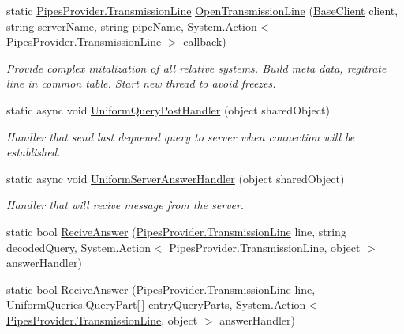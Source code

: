 \begin{DoxyCompactItemize}
static \mbox{\hyperlink{class_pipes_provider_1_1_transmission_line}{Pipes\+Provider.\+Transmission\+Line}} \mbox{\hyperlink{class_uniform_client_1_1_base_client_a80e2da33cf28945db058cd59f7ac5e58}{Open\+Transmission\+Line}} (\mbox{\hyperlink{class_uniform_client_1_1_base_client}{Base\+Client}} client, string server\+Name, string pipe\+Name, System.\+Action$<$ \mbox{\hyperlink{class_pipes_provider_1_1_transmission_line}{Pipes\+Provider.\+Transmission\+Line}} $>$ callback)
\begin{DoxyCompactList}\small\item\em Provide complex initalization of all relative systems. Build meta data, regitrate line in common table. Start new thread to avoid freezes. \end{DoxyCompactList}\item 
static async void \mbox{\hyperlink{class_uniform_client_1_1_base_client_a05120a32c8a00263c7e2fc8b9fa152d8}{Uniform\+Query\+Post\+Handler}} (object shared\+Object)
\begin{DoxyCompactList}\small\item\em Handler that send last dequeued query to server when connection will be established. \end{DoxyCompactList}\item 
static async void \mbox{\hyperlink{class_uniform_client_1_1_base_client_af7a3c613846c8595431272c4c9d531f3}{Uniform\+Server\+Answer\+Handler}} (object shared\+Object)
\begin{DoxyCompactList}\small\item\em Handler that will recive message from the server. \end{DoxyCompactList}\item 
static bool \mbox{\hyperlink{class_uniform_client_1_1_base_client_a6525d87fd1df20689b0a01280e36c5c1}{Recive\+Answer}} (\mbox{\hyperlink{class_pipes_provider_1_1_transmission_line}{Pipes\+Provider.\+Transmission\+Line}} line, string decoded\+Query, System.\+Action$<$ \mbox{\hyperlink{class_pipes_provider_1_1_transmission_line}{Pipes\+Provider.\+Transmission\+Line}}, object $>$ answer\+Handler)
\item 
static bool \mbox{\hyperlink{class_uniform_client_1_1_base_client_a06d3340dd02ec4abfe9cf55bc1db0f03}{Recive\+Answer}} (\mbox{\hyperlink{class_pipes_provider_1_1_transmission_line}{Pipes\+Provider.\+Transmission\+Line}} line, \mbox{\hyperlink{struct_uniform_queries_1_1_query_part}{Uniform\+Queries.\+Query\+Part}}\mbox{[}$\,$\mbox{]} entry\+Query\+Parts, System.\+Action$<$ \mbox{\hyperlink{class_pipes_provider_1_1_transmission_line}{Pipes\+Provider.\+Transmission\+Line}}, object $>$ answer\+Handler)

\end{DoxyCompactItemize}
